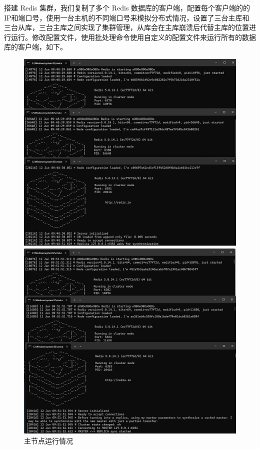 \documentclass[12pt,hyperref,a4paper,UTF8]{ctexart}
\begin{document}
搭建 Redis 集群，我们复制了多个 Redis 数据库的客户端，配置每个客户端的的IP和端口号，使用一台主机的不同端口号来模拟分布式情况，设置了三台主库和三台从库，三台主库之间实现了集群管理，从库会在主库崩溃后代替主库的位置进行运行。修改配置文件，使用批处理命令使用自定义的配置文件来运行所有的数据库的客户端，如下。


\begin{figure}[H]  
    \centering  
    \begin{minipage}{0.495\textwidth}  
        \centering  
        \includegraphics[width=\textwidth]{figures/masters.png}  
        \caption{主节点运行情况}  
    \end{minipage}  
    \hfill %
    \begin{minipage}{0.495\textwidth}  
        \centering  
        \includegraphics[width=\textwidth]{figures/slaves.png}  

\end{minipage}
\end{figure}
\end{document}

